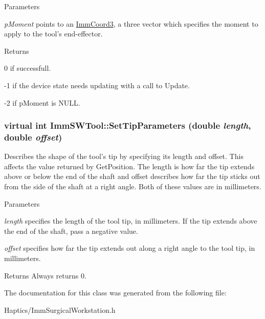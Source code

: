 \begin{DoxyParams}{Parameters}
\item[{\em pMoment}]points to an \hyperlink{structImmCoord3}{ImmCoord3}, a three vector which specifies the moment to apply to the tool's end-\/effector.\end{DoxyParams}
\begin{DoxyReturn}{Returns}

\end{DoxyReturn}
0 if successfull.

-\/1 if the device state needs updating with a call to Update.

-\/2 if pMoment is NULL. \hypertarget{classImmSWTool_a80efdbd8d40aaf6a76ec5989a5e47b92}{
\subsubsection[{SetTipParameters}]{\setlength{\rightskip}{0pt plus 5cm}virtual int ImmSWTool::SetTipParameters (double {\em length}, \/  double {\em offset})}}
\label{classImmSWTool_a80efdbd8d40aaf6a76ec5989a5e47b92}
Describes the shape of the tool's tip by specifying its length and offset. This affects the value returned by GetPosition. The length is how far the tip extends above or below the end of the shaft and offset describes how far the tip sticks out from the side of the shaft at a right angle. Both of these values are in millimeters.


\begin{DoxyParams}{Parameters}
\item[{\em length}]specifies the length of the tool tip, in millimeters. If the tip extends above the end of the shaft, pass a negative value.\item[{\em offset}]specifies how far the tip extends out along a right angle to the tool tip, in millimeters.\end{DoxyParams}
\begin{DoxyReturn}{Returns}
Always returns 0. 
\end{DoxyReturn}


The documentation for this class was generated from the following file:\begin{DoxyCompactItemize}
\item 
Haptics/ImmSurgicalWorkstation.h\end{DoxyCompactItemize}
